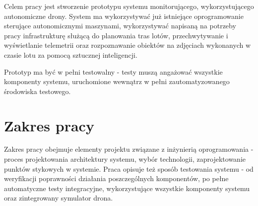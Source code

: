 Celem pracy jest stworzenie prototypu systemu monitorującego, wykorzystującego
autonomiczne drony. System ma wykorzystywać już istniejące oprogramowanie sterujące
autonomicznymi maszynami, wykorzystywać napisaną na potrzeby pracy infrastrukturę
służącą do planowania tras lotów, przechwytywanie i wyświetlanie telemetrii oraz 
rozpoznawanie obiektów na zdjęciach wykonanych w czasie lotu za pomocą sztucznej
inteligencji.

Prototyp ma być w pełni testowalny - testy muszą angażować wszystkie
komponenty systemu, uruchomione wewnątrz w pełni zautomatyzowanego środowiska
testowego.

\section{Zakres pracy}

Zakres pracy obejmuje elementy projektu związane z
inżynierią oprogramowania - proces projektowania architektury systemu,
wybór technologii, zaprojektowanie punktów stykowych w systemie. Praca opisuje
też sposób testowania systemu - od weryfikacji poprawności działania poszczególnych
komponentów, po pełne automatyczne testy integracyjne, wykorzystujące wszystkie
komponenty systemu oraz zintegrowany symulator drona. 
